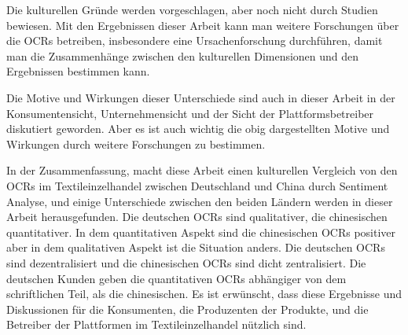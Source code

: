 Die kulturellen Gründe werden vorgeschlagen, aber noch nicht durch Studien bewiesen. Mit den Ergebnissen dieser Arbeit kann man weitere Forschungen über die \acl{OCRs} betreiben, insbesondere eine Ursachenforschung durchführen, damit man die Zusammenhänge zwischen den kulturellen Dimensionen und den Ergebnissen bestimmen kann.

Die Motive und Wirkungen dieser Unterschiede sind auch in dieser Arbeit in der Konsumentensicht, Unternehmensicht und der Sicht der Plattformsbetreiber diskutiert geworden. Aber es ist auch wichtig die obig dargestellten Motive und Wirkungen durch weitere Forschungen zu bestimmen.

In der Zusammenfassung, macht diese Arbeit einen kulturellen Vergleich von den \acl{OCRs} im Textileinzelhandel zwischen Deutschland und China durch Sentiment Analyse, und einige Unterschiede zwischen den beiden Ländern werden in dieser Arbeit herausgefunden. Die deutschen \acl{OCRs} sind qualitativer, die chinesischen quantitativer. In dem quantitativen Aspekt sind die chinesischen \acl{OCRs} positiver aber in dem qualitativen Aspekt ist die Situation anders. Die deutschen \acl{OCRs} sind dezentralisiert und die chinesischen \acl{OCRs} sind dicht zentralisiert. Die deutschen Kunden geben die quantitativen \acl{OCRs} abhängiger von dem schriftlichen Teil, als die chinesischen. Es ist erwünscht, dass diese Ergebnisse und Diskussionen für die Konsumenten,  die Produzenten der Produkte, und die Betreiber der Plattformen im Textileinzelhandel nützlich sind.
